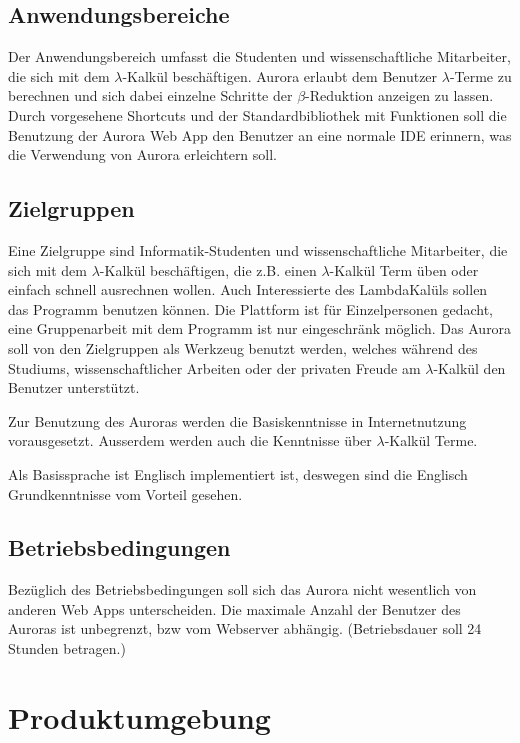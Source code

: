\documentclass[parskip=full,11pt,twoside]{scrartcl}
\begin{document}
\subsection{Anwendungsbereiche}

Der Anwendungsbereich umfasst die Studenten und wissenschaftliche Mitarbeiter, die sich mit dem $\lambda$-Kalkül beschäftigen. Aurora erlaubt dem Benutzer $\lambda$-Terme zu berechnen und sich dabei einzelne Schritte der $\beta$-Reduktion anzeigen zu lassen. Durch vorgesehene Shortcuts und der Standardbibliothek mit Funktionen soll die Benutzung der Aurora Web App den Benutzer an eine normale IDE erinnern, was die Verwendung von Aurora erleichtern soll.

\subsection{Zielgruppen}

Eine Zielgruppe sind Informatik-Studenten und wissenschaftliche Mitarbeiter, die sich mit dem $\lambda$-Kalkül beschäftigen, die z.B. einen $\lambda$-Kalkül Term  üben oder einfach schnell ausrechnen wollen. Auch Interessierte des LambdaKalüls sollen das Programm benutzen können. Die Plattform ist für Einzelpersonen gedacht, eine Gruppenarbeit mit dem Programm ist nur eingeschränk möglich. Das Aurora soll von den Zielgruppen als Werkzeug benutzt werden, welches während des Studiums, wissenschaftlicher Arbeiten oder der privaten Freude am $\lambda$-Kalkül den Benutzer unterstützt.

Zur Benutzung des Auroras werden die Basiskenntnisse in Internetnutzung vorausgesetzt. Ausserdem werden auch die Kenntnisse über $\lambda$-Kalkül Terme.

Als Basissprache ist Englisch implementiert ist, deswegen sind die Englisch Grundkenntnisse vom Vorteil gesehen.

\subsection{Betriebsbedingungen}
Bezüglich des Betriebsbedingungen soll sich das Aurora nicht wesentlich von anderen Web Apps unterscheiden. Die maximale Anzahl der Benutzer des Auroras ist unbegrenzt, bzw vom Webserver abhängig. (Betriebsdauer soll 24 Stunden betragen.) 


\section{Produktumgebung}
\end{document}
